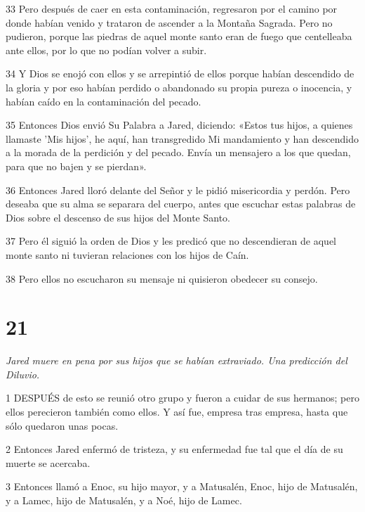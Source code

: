 \par 33 Pero después de caer en esta contaminación, regresaron por el camino por donde habían venido y trataron de ascender a la Montaña Sagrada. Pero no pudieron, porque las piedras de aquel monte santo eran de fuego que centelleaba ante ellos, por lo que no podían volver a subir.

\par 34 Y Dios se enojó con ellos y se arrepintió de ellos porque habían descendido de la gloria y por eso habían perdido o abandonado su propia pureza o inocencia, y habían caído en la contaminación del pecado.

\par 35 Entonces Dios envió Su Palabra a Jared, diciendo: «Estos tus hijos, a quienes llamaste 'Mis hijos', he aquí, han transgredido Mi mandamiento y han descendido a la morada de la perdición y del pecado. Envía un mensajero a los que quedan, para que no bajen y se pierdan».

\par 36 Entonces Jared lloró delante del Señor y le pidió misericordia y perdón. Pero deseaba que su alma se separara del cuerpo, antes que escuchar estas palabras de Dios sobre el descenso de sus hijos del Monte Santo.

\par 37 Pero él siguió la orden de Dios y les predicó que no descendieran de aquel monte santo ni tuvieran relaciones con los hijos de Caín.

\par 38 Pero ellos no escucharon su mensaje ni quisieron obedecer su consejo.

\chapter{21}

\par \textit{Jared muere en pena por sus hijos que se habían extraviado. Una predicción del Diluvio.}

\par 1 DESPUÉS de esto se reunió otro grupo y fueron a cuidar de sus hermanos; pero ellos perecieron también como ellos. Y así fue, empresa tras empresa, hasta que sólo quedaron unas pocas.

\par 2 Entonces Jared enfermó de tristeza, y su enfermedad fue tal que el día de su muerte se acercaba.

\par 3 Entonces llamó a Enoc, su hijo mayor, y a Matusalén, Enoc, hijo de Matusalén, y a Lamec, hijo de Matusalén, y a Noé, hijo de Lamec.

